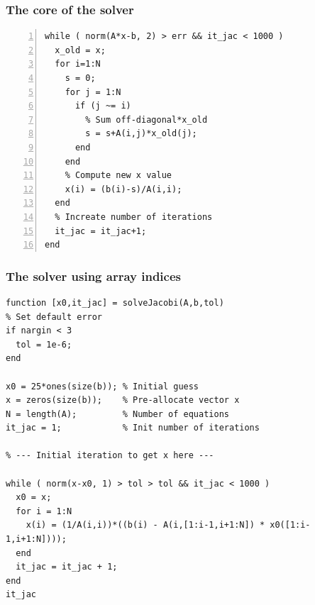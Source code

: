 \documentclass[11pt,table,final,xcolor={usenames,dvipsnames,table}]{beamer}
\begin{document}
\begin{frame}[fragile]
  \frametitle{The core of the solver}
  \begin{lstlisting}[numbers=left]
while ( norm(A*x-b, 2) > err && it_jac < 1000 )
  x_old = x;
  for i=1:N
    s = 0;
    for j = 1:N
      if (j ~= i)
        % Sum off-diagonal*x_old
        s = s+A(i,j)*x_old(j);
      end
    end
    % Compute new x value
    x(i) = (b(i)-s)/A(i,i);
  end
  % Increate number of iterations
  it_jac = it_jac+1;
end
  \end{lstlisting}
\end{frame}


\begin{frame}[fragile]
  \frametitle{The solver using array indices}
  \begin{lstlisting}[basicstyle=\scriptsize\ttfamily]
function [x0,it_jac] = solveJacobi(A,b,tol)
% Set default error
if nargin < 3
  tol = 1e-6;
end

x0 = 25*ones(size(b)); % Initial guess
x = zeros(size(b));    % Pre-allocate vector x
N = length(A);         % Number of equations
it_jac = 1;            % Init number of iterations

% --- Initial iteration to get x here ---

while ( norm(x-x0, 1) > tol > tol && it_jac < 1000 )
  x0 = x;
  for i = 1:N
    x(i) = (1/A(i,i))*((b(i) - A(i,[1:i-1,i+1:N]) * x0([1:i-1,i+1:N])));
  end
  it_jac = it_jac + 1;
end
it_jac
  \end{lstlisting}
\end{frame}
\end{document}
